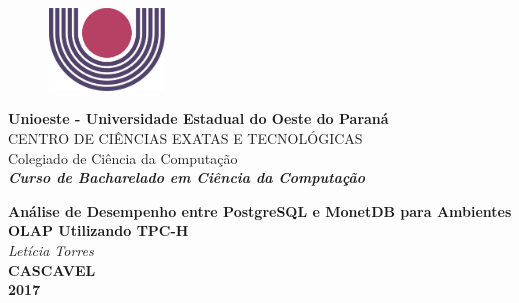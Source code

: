 


\begin{figure}
	\centering
	\includegraphics[width = 3.13cm, height = 2.19cm]{simbolo.jpg}
\end{figure}
\fontsize{13}{13}
\noindent
\textbf{Unioeste - Universidade Estadual do Oeste do Paraná}\\
\fontsize{11}{11}
CENTRO DE CIÊNCIAS EXATAS E TECNOLÓGICAS\\
Colegiado de Ciência da Computação\\
\textbf{\textit{Curso de Bacharelado em Ciência da Computação}}
\vspace{9cm}
\begin{center}
\fontsize{13}{13}
\textbf{Análise de Desempenho entre PostgreSQL e MonetDB para Ambientes OLAP Utilizando TPC-H}\\
\vspace{0.3cm}
\textit{Letícia Torres}\\
\vspace{9cm}
\textbf{CASCAVEL}\\
\textbf{2017}
\end{center}



